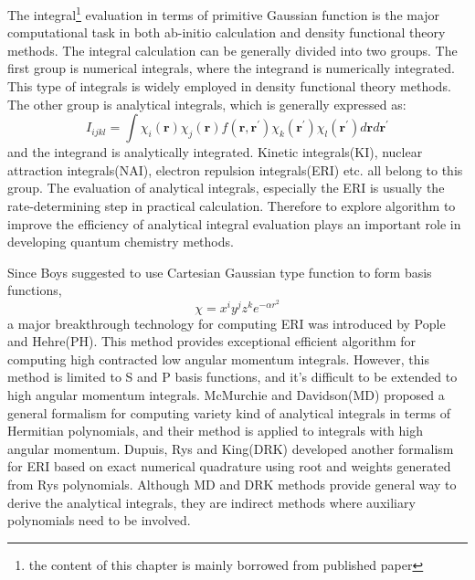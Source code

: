 The integral\footnote{the content of this chapter is mainly borrowed from published paper} 
evaluation in terms of primitive Gaussian 
function is the major computational task in both ab-initio calculation 
and density functional theory methods\cite{gill1994molecular}. The integral 
calculation can be generally divided into two groups. The first group 
is numerical integrals, where the integrand is numerically 
integrated. This type of integrals is widely employed in density 
functional theory methods\cite{Becke,PGPOPLE}. The other group is analytical integrals,
which is generally expressed as:
\begin{equation}\label{int_paper:1}
  I_{ijkl} = \int \chi_{i}(\bm{r})\chi_{j}(\bm{r})f(\bm{r},\bm{r^{'}})
\chi_{k}(\bm{r^{'}})\chi_{l}(\bm{r^{'}}) d\bm{r} d\bm{r^{'}}
\end{equation}
and the integrand is analytically integrated. Kinetic integrals(KI),
nuclear attraction integrals(NAI), electron repulsion integrals(ERI) etc. all 
belong to this group. The evaluation of analytical integrals, especially the ERI is usually the 
rate-determining step in practical calculation. Therefore to explore algorithm 
to improve the efficiency of analytical integral evaluation plays an important role
in developing quantum chemistry methods.

Since Boys\cite{SFBoys1950} suggested to use Cartesian Gaussian type function to form 
basis functions,
\begin{equation}\label{int_paper:2}
 \chi = x^{i}y^{j}z^{k}e^{-\alpha r^{2}}
\end{equation}
a major breakthrough technology for computing ERI was introduced by Pople and Hehre(PH)\cite{PH}. 
This method provides exceptional efficient algorithm for computing high contracted 
low angular momentum integrals. However, this method is limited to S and P basis functions, 
and it's difficult to be extended to high angular momentum integrals. McMurchie and Davidson(MD)\cite{MD}
proposed a general formalism for computing variety kind of analytical integrals in terms of 
Hermitian polynomials, and their method is applied to integrals with high angular momentum. 
Dupuis, Rys and King(DRK)\cite{DRK1976JCOMP,DRK1976JCP,DRK1983JCOMP} developed another formalism 
for ERI based on exact numerical 
quadrature using root and weights generated from Rys polynomials. Although MD and DRK
methods provide general way to derive the analytical integrals, they are indirect methods where
auxiliary polynomials need to be involved. 

